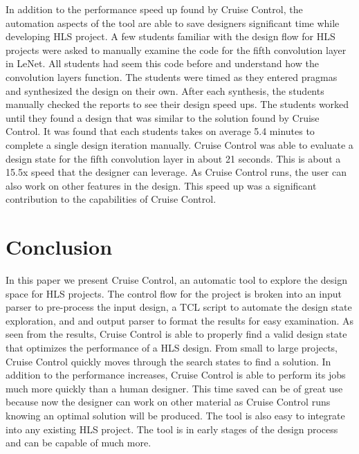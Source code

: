\documentclass[letterpaper, 10 pt, conference]{IEEEconf}  %
\begin{document}
In addition to the performance speed up found by Cruise Control, the automation aspects of the tool are able to save designers significant time while developing HLS project. A few students familiar with the design flow for HLS projects were asked to manually examine the code for the fifth convolution layer in LeNet. All students had seem this code before and understand how the convolution layers function. The students were timed as they entered pragmas and synthesized the design on their own. After each synthesis, the students manually checked the reports to see their design speed ups. The students worked until they found a design that was similar to the solution found by Cruise Control. It was found that each students takes on average 5.4 minutes to complete a single design iteration manually. Cruise Control was able to evaluate a design state for the fifth convolution layer in about 21 seconds. This is about a 15.5x speed that the designer can leverage. As Cruise Control runs, the user can also work on other features in the design. This speed up was a significant contribution to the capabilities of Cruise Control. 



\section{Conclusion}
In this paper we present Cruise Control, an automatic tool to explore the design space for HLS projects. The control flow for the project is broken into an input parser to pre-process the input design, a TCL script to automate the design state exploration, and and output parser to format the results for easy examination. As seen from the results, Cruise Control is able to properly find a valid design state that optimizes the performance of a HLS design. From small to large projects, Cruise Control quickly moves through the search states to find a solution. In addition to the performance increases, Cruise Control is able to perform its jobs much more quickly than a human designer. This time saved can be of great use because now the designer can work on other material as Cruise Control runs knowing an optimal solution will be produced. The tool is also easy to integrate into any existing  HLS project. The tool is in early stages of the design process and can be capable of much more. 
\end{document}
